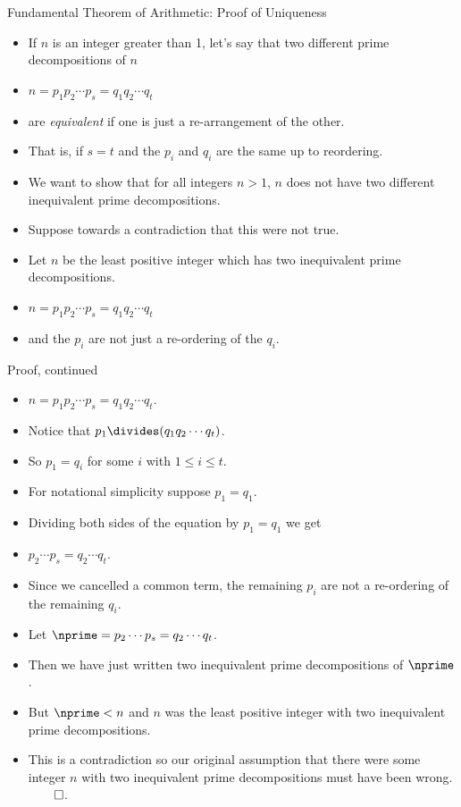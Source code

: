 \documentclass[handout]{beamer}
\begin{document}
\begin{frame}{Fundamental Theorem of Arithmetic: Proof of Uniqueness}
\begin{itemize}
  \item If $n$ is an integer greater than 1, let's say that two different prime decompositions of $n$
  \item $n=p_1 p_2 \cdots p_s = q_1 q_2 \cdots q_t$
  \item are \emph{equivalent} if one is just a re-arrangement of the other.
  \item That is, if $s=t$ and the $p_i$ and $q_i$ are the same up to reordering.
  \item We want to show that for all integers $n>1$, $n$ does not have two different inequivalent prime decompositions.
  \item Suppose towards a contradiction that this were not true.
  \item Let $n$ be the least positive integer which has two inequivalent prime decompositions.
  \item $n=p_1 p_2 \cdots p_s = q_1 q_2 \cdots q_t$
  \item and the $p_i$ are not just a re-ordering of the $q_i$.
\end{itemize}
\end{frame}

\begin{frame}{Proof, continued}
\begin{itemize}
  \item $n=p_1 p_2 \cdots p_s = q_1 q_2 \cdots q_t$.
  \item Notice that $p_1 \divides (q_1 q_2 \cdots q_t)$.
  \item So $p_1 = q_i$ for some $i$ with $1\leq i \leq t$.
  \item For notational simplicity suppose $p_1=q_1$.
  \item Dividing both sides of the equation by $p_1 = q_1$ we get
  \item $p_2 \cdots p_s = q_2 \cdots q_t$.
  \item Since we cancelled a common term, the remaining $p_i$ are not a re-ordering of the remaining $q_i$.
  \item Let $\nprime = p_2 \cdots p_s = q_2 \cdots q_t$.
  \item Then we have just written two inequivalent prime decompositions of $\nprime$.
  \item But $\nprime<n$ and $n$ was the least positive integer with two inequivalent prime decompositions.
  \item This is a contradiction so our original assumption that there were some integer $n$ with two
  inequivalent prime decompositions must have been wrong. $\qed$.
\end{itemize}
\end{frame}
\end{document}
